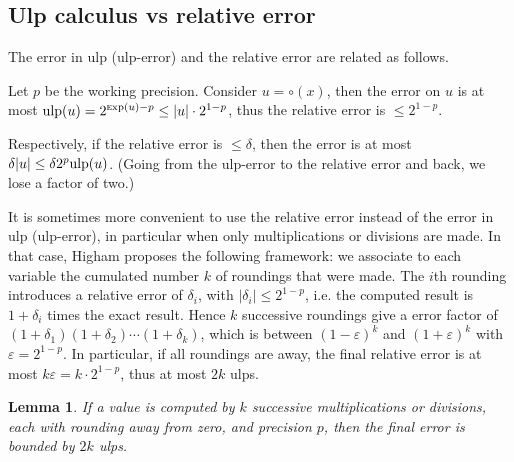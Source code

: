 \documentclass[12pt]{amsart}
\def\ulp{{\rm ulp}}
\def\Exp{{\rm \textsc exp}}
\newtheorem{lemma}{Lemma}
\begin{document}
\subsection{Ulp calculus vs relative error}

The error in ulp (ulp-error) and the relative error are related as follows.

Let $p$ be the working precision.
Consider $u = \circ(x)$, then the error on $u$ is at most
$\ulp(u) = 2^{\Exp(u)-p} \leq |u| \cdot 2^{1-p}$, thus the relative error
is $\leq 2^{1-p}$.

Respectively, if the relative error is $\leq \delta$, then the error
is at most $\delta |u| \leq \delta 2^p \ulp(u)$. (Going from the ulp-error
to the relative error and back, we lose a factor of two.)

It is sometimes more convenient to use the relative error instead of the
error in ulp (ulp-error), in particular when only multiplications or
divisions are made.
In that case,
Higham \cite{Higham02} proposes the following framework:
we associate to each variable the cumulated number $k$ of roundings that were
made.
The $i$th rounding introduces a relative error of $\delta_i$,
with $|\delta_i| \leq 2^{1-p}$, i.e. the computed result is
$1+\delta_i$ times the exact result.
Hence $k$ successive roundings give a error factor of $(1+\delta_1)
(1+\delta_2) \cdots (1+\delta_k)$, which is between $(1-\varepsilon)^k$
and $(1+\varepsilon)^k$ with $\varepsilon = 2^{1-p}$.
In particular, if all roundings are away, the final relative error is
at most $k \varepsilon = k \cdot 2^{1-p}$, thus at most $2k$ ulps.

\begin{lemma} \label{rel_ulp}
If a value is computed by $k$ successive multiplications or divisions,
each with rounding away from zero, and precision $p$, then the final
error is bounded by $2k$ ulps.
\end{lemma}
\end{document}
